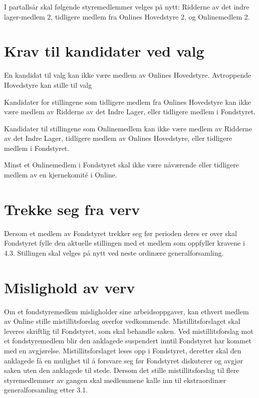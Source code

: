 I partallsår skal følgende styremedlemmer velges på nytt: Ridderne av det indre lager-medlem 2, tidligere medlem fra Onlines Hovedstyre 2, og Onlinemedlem 2.

\section{Krav til kandidater ved valg}
En kandidat til valg kan ikke være medlem av Onlines Hovedstyre. Avtroppende Hovedstyre kan stille til valg

Kandidater for stillingene som tidligere medlem fra Onlines Hovedstyre kan ikke være medlem av Ridderne av det Indre Lager, eller tidligere medlem i Fondstyret.

Kandidater til stillingene som Onlinemedlem kan ikke være medlem av Ridderne av det Indre Lager, tidligere medlem av Onlines Hovedstyre, eller tidligere medlem i Fondstyret.

Minst et Onlinemedlem i Fondstyret skal ikke være nåværende eller tidligere medlem av en kjernekomité i Online.

\section{Trekke seg fra verv}

Dersom et medlem av Fondstyret trekker seg før perioden deres er over skal Fondstyret fylle den aktuelle stillingen med et medlem som oppfyller kravene i 4.3. Stillingen skal velges på nytt ved neste ordinære generalforsamling.

\section{Mislighold av verv}
Om et fondstyremedlem misligholder sine arbeidsoppgaver, kan ethvert medlem av Online stille mistillitsforslag overfor vedkommende. Mistillitsforslaget skal leveres skriftlig til Fondstyret, som skal behandle saken. Ved mistillitsforslag mot et fondstyremedlem blir den anklagede suspendert inntil Fondstyret har kommet med en avgjørelse. Mistillitsforslaget leses opp i Fondstyret, deretter skal den anklagede få en mulighet til å forsvare seg før Fondstyret diskuterer og avgjør saken uten den anklagede til stede. Dersom det stille mistillitsforslag til flere styremedlemmer av gangen skal medlemmene kalle inn til ekstraordinær generalforsamling etter 3.1.
